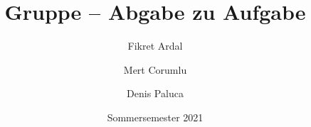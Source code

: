 \documentclass[course=erap]{aspdoc}
\author{Fikret Ardal \and Mert Corumlu \and Denis Paluca}
\date{Sommersemester 2021} %
\title{Gruppe \theGroup{} -- Abgabe zu Aufgabe \theNumber}
\begin{document}
\maketitle









{}
\end{document}
